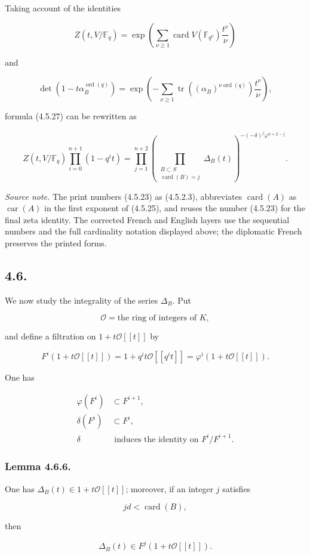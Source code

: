 Taking account of the identities

\begin{equation}\tag{4.5.31}
Z(t,V/\mathbb F_q)
=\exp\!\left(
\sum_{\nu\geq1}
\operatorname{card}V(\mathbb F_{q^\nu})\frac{t^\nu}{\nu}
\right)
\end{equation}

and

\begin{equation}\tag{4.5.32}
\det\!\left(1-t\alpha_B^{\operatorname{ord}(q)}\right)
=\exp\!\left(
-\sum_{\nu\geq1}
\operatorname{tr}\!\left((\alpha_B)^{\nu\operatorname{ord}(q)}\right)
\frac{t^\nu}{\nu}
\right),
\end{equation}

formula (4.5.27) can be rewritten as

\begin{equation}\tag{4.5.33}
Z(t,V/\mathbb F_q)\prod_{i=0}^{n+1}(1-q^it)
=\prod_{j=1}^{n+2}
\left(
\prod_{\substack{B\subset S\\\operatorname{card}(B)=j}}
\Delta_B(t)
\right)^{-(-\delta)^j\varphi^{n+2-j}}.
\end{equation}

\medskip
\noindent\emph{Source note.}
The print numbers (4.5.23) as (4.5.2.3), abbreviates
$\operatorname{card}(A)$ as $\operatorname{car}(A)$ in the first exponent
of (4.5.25), and reuses the number (4.5.23) for the final zeta identity.
The corrected French and English layers use the sequential numbers and the
full cardinality notation displayed above; the diplomatic French preserves
the printed forms.

\subsection*{4.6.}
We now study the integrality of the series $\Delta_B$. Put

\begin{equation}\tag{4.6.1}
\mathcal O=\text{the ring of integers of $K$},
\end{equation}

and define a filtration on $1+t\mathcal O[[t]]$ by

\begin{equation}\tag{4.6.2}
F^i(1+t\mathcal O[[t]])
=1+q^it\mathcal O[[q^it]]
=\varphi^i(1+t\mathcal O[[t]]).
\end{equation}

One has

\begin{align}
\varphi(F^i)&\subset F^{i+1}, \tag{4.6.3}\\
\delta(F^i)&\subset F^i, \tag{4.6.4}\\
\delta&\text{ induces the identity on }F^i/F^{i+1}. \tag{4.6.5}
\end{align}

\subsubsection*{Lemma 4.6.6.}
One has $\Delta_B(t)\in1+t\mathcal O[[t]]$; moreover, if an integer $j$
satisfies

\begin{equation}\tag{4.6.7}
jd<\operatorname{card}(B),
\end{equation}

then

\begin{equation}\tag{4.6.8}
\Delta_B(t)\in F^j(1+t\mathcal O[[t]]).
\end{equation}

